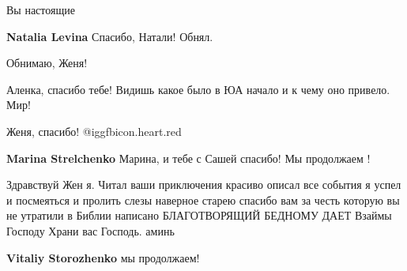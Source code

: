 \begin{itemize}
Вы настоящие

\textbf{Natalia Levina} Спасибо, Натали! Обнял.

Обнимаю, Женя!

Аленка, спасибо тебе! Видишь какое было в ЮА начало и к чему оно привело. Мир!

Женя, спасибо! @igg{fbicon.heart.red}

\textbf{Marina Strelchenko} Марина, и тебе с Сашей спасибо! Мы продолжаем !


Здравствуй Жен я. Читал ваши приключения красиво описал все события я успел и
посмеяться и пролить слезы наверное старею спасибо вам за честь которую вы не
утратили в Библии написано БЛАГОТВОРЯЩИЙ БЕДНОМУ ДАЕТ Взаймы Господу Храни вас
Господь. аминь

\textbf{Vitaliy Storozhenko} мы продолжаем!

\end{itemize} %
